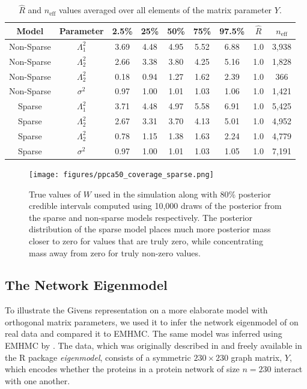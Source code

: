 \documentclass[ba]{imsart}
\numberwithin{equation}{section}
\theoremstyle{plain}
\begin{document}
\begin{table}
\begin{tabular}{|cc||ccccccc|}
\hline
Model & Parameter & 2.5\% & 25\% & 50\% & 75\% & 97.5\% &  $\hat{R}$ & $n_{\mathrm{eff}}$\\
\hline
\hline
Non-Sparse & $\Lambda_1^2$  & 3.69 & 4.48 & 4.95 & 5.52 & 6.88 & 1.0 & 3,938\\
Non-Sparse & $\Lambda_2^2$  & 2.66 & 3.38 & 3.80 & 4.25 & 5.16 & 1.0 & 1,828\\
Non-Sparse & $\Lambda_2^2$  & 0.18 & 0.94 & 1.27 & 1.62 & 2.39 & 1.0 & 366 \\
Non-Sparse &  $\sigma^2$ & 0.97 & 1.00 & 1.01 & 1.03 & 1.06 & 1.0 & 1,421\\
\hline
Sparse & $\Lambda_1^2$  & 3.71 & 4.48 & 4.97 & 5.58 & 6.91 & 1.0 & 5,425\\
Sparse & $\Lambda_2^2$  & 2.67 & 3.31 & 3.70 & 4.13 & 5.01 & 1.0 & 4,952\\
Sparse & $\Lambda_2^2$  & 0.78 & 1.15 & 1.38 & 1.63 & 2.24 & 1.0 & 4,779 \\
Sparse &  $\sigma^2$ & 0.97 & 1.00 & 1.01 & 1.03 & 1.05 & 1.0 & 7,191\\
\hline
\end{tabular}
\caption{$\hat{R}$ and $n_{\mathrm{eff}}$ values averaged over all elements of the matrix parameter $Y$. }
\label{tab:ppca50_sparse}
\end{table}

\begin{figure}[h]
\centering
\vspace{.1in}
\texttt{[image: figures/ppca50\_coverage\_sparse.png]}
\vspace{.05in}
\caption{True values of $W$ used in the simulation along with 80\% posterior credible intervals computed using 10,000 draws of the posterior from the sparse and non-sparse models respectively. The posterior distribution of the sparse model places much more posterior mass closer to zero for values that are truly zero, while concentrating mass away from zero for truly non-zero values.}
\label{fig:ppca50_coverage_sparse}
\end{figure}

\subsection{The Network Eigenmodel}
To illustrate the Givens representation on a more elaborate model with orthogonal matrix parameters, we used it to infer the network eigenmodel of \cite{hoff2009simulation} on real data and compared it to EMHMC. The same model was inferred using EMHMC by \cite{byrne2013geodesic}. The data, which was originally described in \cite{butland2005interaction} and freely available in the R package \textit{eigenmodel}, consists of a symmetric $230 \times 230$ graph matrix, $Y$, which encodes whether the proteins in a protein network of size $n=230$ interact with one another.
\end{document}
